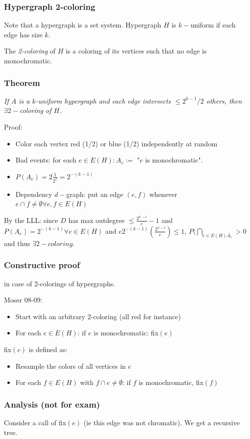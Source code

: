 \documentclass[11pt]{book}
\begin{document}
\subsubsection{Hypergraph 2-coloring}
Note that a hypergraph is a set system. Hypergraph $H$ is $k-$uniform if each edge has size $k$.

The \textit{2-coloring} of $H$ is a coloring of its vertices such that no edge is monochromatic.

\subsubsection{Theorem} 
\textit{If $A$ is a $k$-uniform hypergraph and each edge intersects $\leq 2^{k-1}/2$ others, then $\exists 2-$coloring of $H$.}

Proof: \begin{itemize}
	\item Color each vertex red (1/2) or blue (1/2) independently at random
	\item Bad events: for each $e \in E(H) : A_e := $ "$e$ is monochromatic".
	\item $P(A_e) = 2 \frac{1}{2^k} = 2^{-(k-1)}$
	\item Dependency $d-$graph: put an edge $(e,f)$ whenever $e \cap f \neq \emptyset \forall e, f \in E(H)$
\end{itemize}

By the LLL: since $D$ has max outdegree $\leq \frac{2^{k-1}}{e} -1$ and $P(A_e) = 2^{-(k-1)} \forall e \in E(H)$ and $e 2^{-(k-1)} \left( \frac{2^{k-1}}{e} \right) \leq 1$, $P(\bigcap_{e \in E(H) \bar{A_e}} > 0$ and thus $\exists 2-coloring$.

\subsubsection{Constructive proof}
in case of 2-colorings of hypergraphs.

Moser 08-09:
\begin{itemize}
	\item Start with an arbitrary 2-coloring (all red for instance)
	\item For each $e \in E(H)$: if $e$ is monochromatic: fix$(e)$
\end{itemize}

fix$(e)$ is defined as:
\begin{itemize}
	\item Resample the colors of all vertices in $e$
	\item For each $f \in E(H)$ with $f \cap e \neq \emptyset$: if $f$ is monochromatic, fix$(f)$
\end{itemize}


\subsubsection{Analysis (not for exam)}
Consider a call of fix$(e)$ (ie this edge was not chromatic). We get a recursive tree.
\end{document}
